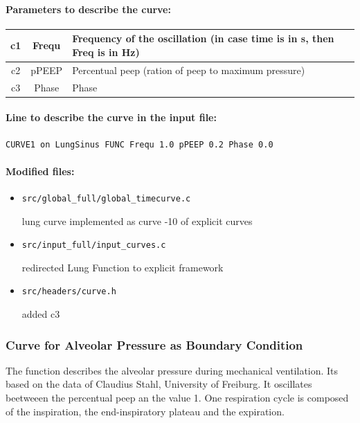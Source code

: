 \paragraph*{Parameters to describe the curve:\\}

\begin{tabular}{|c|c|p{125mm}|}
	\hline
	c1	& Frequ	& Frequency of the oscillation (in case time is in s, then Freq is in Hz) \\
	\hline
	c2	& pPEEP 	& Percentual peep (ration of peep to maximum pressure)\\
	\hline
	c3	& Phase 	& Phase\\
	\hline
\end{tabular}

\paragraph*{Line to describe the curve in the input file:\\}
{\tt CURVE1 on LungSinus FUNC Frequ 1.0 pPEEP 0.2 Phase 0.0}


\paragraph*{Modified files:\\}

\begin{itemize}
	\item {\tt src/global\_full/global\_timecurve.c}
	\par \noindent lung curve implemented as curve -10 of explicit curves

	\item {\tt src/input\_full/input\_curves.c}
	\par \noindent redirected Lung Function to explicit framework

	\item {\tt src/headers/curve.h}
	\par \noindent added c3
\end{itemize}


\subsubsection*{Curve for Alveolar Pressure as Boundary Condition}

The function describes the alveolar pressure during mechanical ventilation.
Its based on the data of Claudius Stahl, University of Freiburg.
It oscillates beetweeen the percentual peep an the value 1.
One respiration cycle is composed of the inspiration, the end-inspiratory plateau and the expiration.


